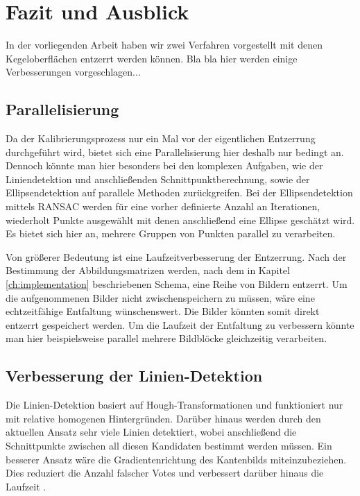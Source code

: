 \chapter{Fazit und Ausblick}
\label{ch:summary}

In der vorliegenden Arbeit haben wir zwei Verfahren vorgestellt mit denen Kegeloberflächen entzerrt werden können.
Bla bla hier werden einige Verbesserungen vorgeschlagen...

\section{Parallelisierung}
Da der Kalibrierungsprozess nur ein Mal vor der eigentlichen Entzerrung durchgeführt wird, bietet sich eine Parallelisierung hier deshalb nur bedingt an.
Dennoch könnte man hier besonders bei den komplexen Aufgaben, wie der Liniendetektion \cite{Havel2014} und anschließenden Schnittpunktberechnung, sowie der Ellipsendetektion auf parallele Methoden zurückgreifen. 
Bei der Ellipsendetektion mittels RANSAC werden für eine vorher definierte Anzahl an Iterationen, wiederholt Punkte ausgewählt mit denen anschließend eine Ellipse geschätzt wird. Es bietet sich hier an, mehrere Gruppen von Punkten parallel zu verarbeiten. 

Von größerer Bedeutung ist eine Laufzeitverbesserung der Entzerrung. Nach der Bestimmung der Abbildungsmatrizen werden, nach dem in Kapitel \ref{ch:implementation} beschriebenen Schema, eine Reihe von Bildern entzerrt. Um die aufgenommenen Bilder nicht zwischenspeichern zu müssen, wäre eine echtzeitfähige Entfaltung wünschenswert. Die Bilder könnten somit direkt entzerrt gespeichert werden.  Um die Laufzeit der Entfaltung zu verbessern könnte man hier beispielsweise parallel mehrere Bildblöcke gleichzeitig verarbeiten.


\section{Verbesserung der Linien-Detektion}
Die Linien-Detektion basiert auf Hough-Transformationen und funktioniert nur mit relative homogenen Hintergründen. Darüber hinaus werden durch den aktuellen Ansatz sehr viele Linien detektiert, wobei anschließend die Schnittpunkte zwischen all diesen Kandidaten bestimmt werden müssen. Ein besserer Ansatz wäre die Gradientenrichtung des Kantenbilds miteinzubeziehen. Dies reduziert die Anzahl falscher Votes und verbessert darüber hinaus die Laufzeit \cite{Gorman1976}. 


